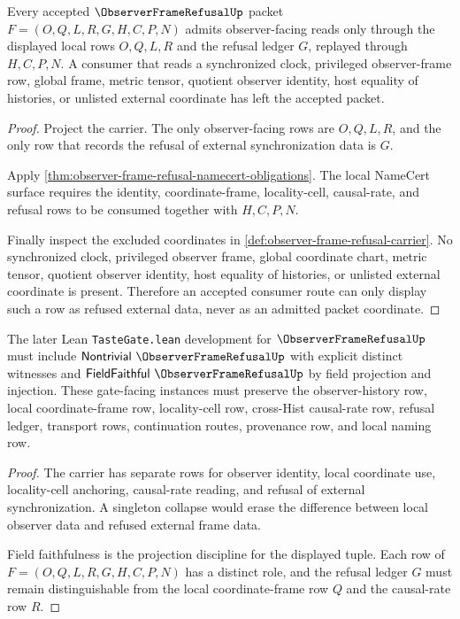 \begin{theorem}
\label{thm:observer-frame-refusal-no-global-sync-boundary}
Every accepted $\ObserverFrameRefusalUp$ packet $F=(O,Q,L,R,G,H,C,P,N)$ admits observer-facing reads only through the displayed local rows $O,Q,L,R$ and the refusal ledger $G$, replayed through $H,C,P,N$. A consumer that reads a synchronized clock, privileged observer-frame row, global frame, metric tensor, quotient observer identity, host equality of histories, or unlisted external coordinate has left the accepted packet.
\end{theorem}
\begin{proof}
Project the carrier. The only observer-facing rows are $O,Q,L,R$, and the only row that records the refusal of external synchronization data is $G$.

Apply \autoref{thm:observer-frame-refusal-namecert-obligations}. The local NameCert surface requires the identity, coordinate-frame, locality-cell, causal-rate, and refusal rows to be consumed together with $H,C,P,N$.

Finally inspect the excluded coordinates in \autoref{def:observer-frame-refusal-carrier}. No synchronized clock, privileged observer frame, global coordinate chart, metric tensor, quotient observer identity, host equality of histories, or unlisted external coordinate is present. Therefore an accepted consumer route can only display such a row as refused external data, never as an admitted packet coordinate.
\end{proof}

\begin{theorem}
\label{thm:observer-frame-refusal-tastegate-obligation}
The later Lean \texttt{TasteGate.lean} development for $\ObserverFrameRefusalUp$ must include $\mathsf{Nontrivial}\ \ObserverFrameRefusalUp$ with explicit distinct witnesses and $\mathsf{FieldFaithful}\ \ObserverFrameRefusalUp$ by field projection and injection. These gate-facing instances must preserve the observer-history row, local coordinate-frame row, locality-cell row, cross-Hist causal-rate row, refusal ledger, transport rows, continuation routes, provenance row, and local naming row.
\end{theorem}
\begin{proof}
The carrier has separate rows for observer identity, local coordinate use, locality-cell anchoring, causal-rate reading, and refusal of external synchronization. A singleton collapse would erase the difference between local observer data and refused external frame data.

Field faithfulness is the projection discipline for the displayed tuple. Each row of $F=(O,Q,L,R,G,H,C,P,N)$ has a distinct role, and the refusal ledger $G$ must remain distinguishable from the local coordinate-frame row $Q$ and the causal-rate row $R$.
\end{proof}


